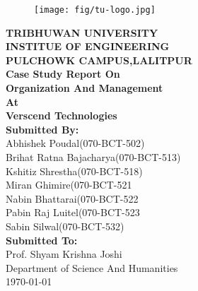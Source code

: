 \begin{titlepage}
\centering
\begin{figure}[h!]
\centering
\texttt{[image: fig/tu-logo.jpg]}
\end{figure}
\vspace{10mm}
{\large\textbf{TRIBHUWAN UNIVERSITY\\
INSTITUE OF ENGINEERING\\
PULCHOWK CAMPUS,LALITPUR\\}}
\vspace{10mm}
\textbf{ Case Study Report On\\
Organization And Management\\
At\\
Verscend Technologies}\\
\vspace{10mm}
\textbf{Submitted By:}\\
Abhishek Poudal(070-BCT-502)\\
Brihat Ratna Bajacharya(070-BCT-513)\\
Kshitiz Shrestha(070-BCT-518)\\
Miran Ghimire(070-BCT-521\\
Nabin Bhattarai(070-BCT-522\\
Pabin Raj Luitel(070-BCT-523\\
Sabin Silwal(070-BCT-532)\\
\vspace{10mm}
\textbf{Submitted To:}\\
Prof. Shyam Krishna Joshi\\
Department of Science And Humanities\\
\vspace{10mm}
\vfill
\today
\end{titlepage}
\cleardoublepage

